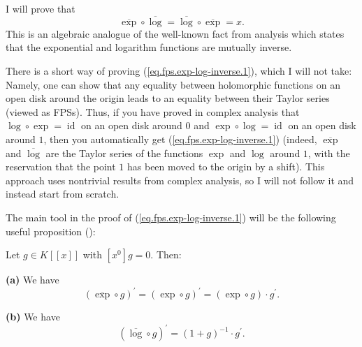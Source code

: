 I will prove that
\begin{equation}
\overline{\exp}\circ\overline{\log}=\overline{\log}\circ\overline{\exp}=x.
\label{eq.fps.exp-log-inverse.1}%
\end{equation}
This is an algebraic analogue of the well-known fact from analysis which
states that the exponential and logarithm functions are mutually inverse.

There is a short way of proving (\ref{eq.fps.exp-log-inverse.1}), which I will
not take: Namely, one can show that any equality between holomorphic functions
on an open disk around the origin leads to an equality between their Taylor
series (viewed as FPSs). Thus, if you have proved in complex analysis that
$\log\circ\exp=\operatorname*{id}$ on an open disk around $0$ and $\exp
\circ\log=\operatorname*{id}$ on an open disk around $1$, then you
automatically get (\ref{eq.fps.exp-log-inverse.1}) (indeed, $\overline{\exp}$
and $\overline{\log}$ are the Taylor series of the functions $\exp$ and $\log$
around $1$, with the reservation that the point $1$ has been moved to the
origin by a shift). This approach uses nontrivial results from complex
analysis, so I will not follow it and instead start from scratch.

The main tool in the proof of (\ref{eq.fps.exp-log-inverse.1}) will be the
following useful proposition (\cite[Lemma 0.4]{logexp}):

\begin{proposition}
\label{prop.fps.exp-log-der}Let $g\in K\left[  \left[  x\right]  \right]  $
with $\left[  x^{0}\right]  g=0$. Then: \medskip

\textbf{(a)} We have%
\[
\left(  \overline{\exp}\circ g\right)  ^{\prime}=\left(  \exp\circ g\right)
^{\prime}=\left(  \exp\circ g\right)  \cdot g^{\prime}.
\]


\textbf{(b)} We have%
\[
\left(  \overline{\log}\circ g\right)  ^{\prime}=\left(  1+g\right)
^{-1}\cdot g^{\prime}.
\]

\end{proposition}

